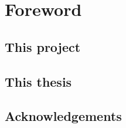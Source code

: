 \section*{Foreword}

\subsection*{This project}


\subsection*{This thesis}


\subsection*{Acknowledgements}

 

